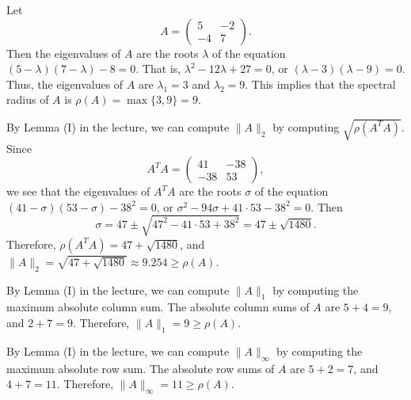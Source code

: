 \documentclass{homework}
\begin{document}
	\maketitle
	
	\question
	Let
	\begin{equation}
		A = \left(\begin{matrix}
			5 & -2 \\
			-4 & 7
		\end{matrix}\right).
	\end{equation}
	Then the eigenvalues of $A$ are the roots $\lambda$ of the equation $(5-\lambda)(7-\lambda) - 8 = 0$. That is, $\lambda^2-12\lambda +27 = 0$, or $(\lambda - 3)(\lambda - 9) = 0$. Thus, the eigenvalues of $A$ are $\lambda_1=3$ and $\lambda_2=9$. This implies that the spectral radius of $A$ is $\rho(A) = \max\{3,9\} = 9$.
	
	By Lemma (I) in the lecture, we can compute $\lVert A \rVert_2$ by computing $\sqrt{\rho(A^TA)}$. Since
	\begin{equation}
		A^TA = \left(\begin{matrix}
			41 & -38 \\
			-38 & 53
		\end{matrix}\right),
	\end{equation}
	we see that the eigenvalues of $A^TA$ are the roots $\sigma$ of the equation $(41-\sigma)(53-\sigma) - 38^2=0$, or $\sigma^2 - 94\sigma + 41\cdot53 - 38^2 = 0$. Then
	\begin{equation}
		\sigma = 47 \pm \sqrt{47^2 - 41\cdot53 + 38^2}= 47\pm\sqrt{1480}.
	\end{equation}
	Therefore, $\rho(A^TA) = 47 + \sqrt{1480}$, and $\lVert A\rVert_2 = \sqrt{47 + \sqrt{1480}} \approx 9.254 \ge \rho(A)$.
	
	By Lemma (I) in the lecture, we can compute $\lVert A\rVert_1$ by computing the maximum absolute column sum. The absolute column sums of $A$ are $5+4=9$, and $2 + 7 = 9$. Therefore, $\lVert A\rVert_1 = 9 \ge \rho(A)$.
	
	By Lemma (I) in the lecture, we can compute $\lVert A \rVert_\infty$ by computing the maximum absolute row sum. The absolute row sums of $A$ are $5 + 2 = 7$, and $4 + 7 = 11$. Therefore, $\lVert A \rVert_\infty = 11 \ge \rho(A)$.
	
\end{document}
